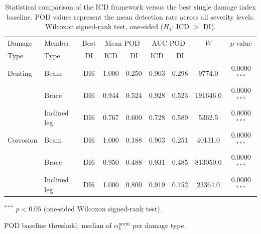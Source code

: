 \begin{table}[H]
  \centering
  \caption{Statistical comparison of the ICD framework versus the best single damage index baseline. POD values represent the mean detection rate across all severity levels. Wilcoxon signed-rank test, one-sided ($H_1$: ICD $>$ DI).}
  \label{tab:wilcoxon_POD}
  \begin{threeparttable}
  \begin{tabular}{llccccccc}
    \toprule
    Damage & Member & Best & \multicolumn{2}{c}{Mean POD} & \multicolumn{2}{c}{AUC-POD} & $W$ & $p$-value \\
    Type & Type & DI & ICD & DI & ICD & DI & & \\
    \midrule
    Denting & Beam & DI6 & 1.000 & 0.250 & 0.903 & 0.298 & 9774.0 & 0.0000$^{***}$ \\
     & Brace & DI6 & 0.944 & 0.524 & 0.928 & 0.523 & 191646.0 & 0.0000$^{***}$ \\
     & Inclined leg & DI6 & 0.767 & 0.600 & 0.728 & 0.589 & 5362.5 & 0.0000$^{***}$ \\
    \midrule
    Corrosion & Beam & DI6 & 1.000 & 0.188 & 0.903 & 0.251 & 40131.0 & 0.0000$^{***}$ \\
     & Brace & DI6 & 0.950 & 0.488 & 0.931 & 0.485 & 813050.0 & 0.0000$^{***}$ \\
     & Inclined leg & DI6 & 1.000 & 0.800 & 0.919 & 0.752 & 23364.0 & 0.0000$^{***}$ \\
    \bottomrule
  \end{tabular}
  \begin{tablenotes}[para]\small
    \item $^{***}$ $p < 0.05$ (one-sided Wilcoxon signed-rank test).
    \item POD baseline threshold: median of $\alpha_k^{\text{norm}}$ per damage type.
  \end{tablenotes}
  \end{threeparttable}
\end{table}